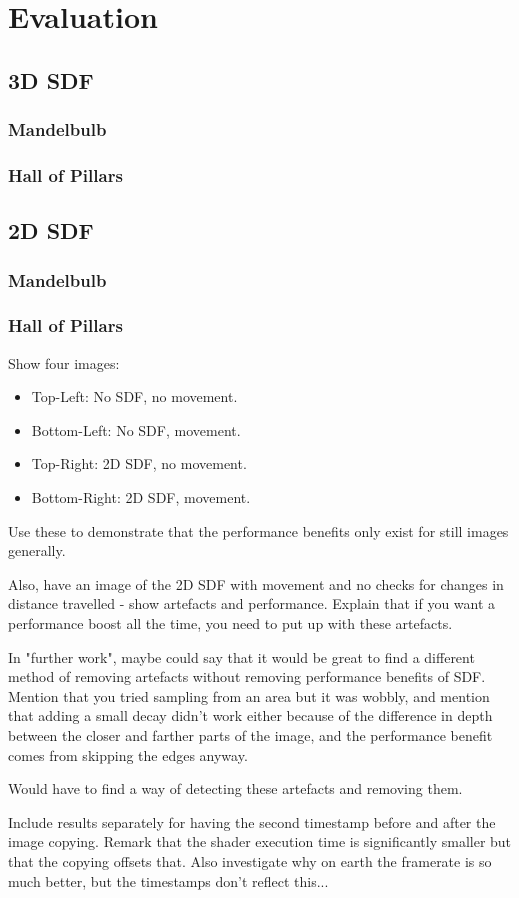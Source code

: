 \chapter{Evaluation}
\label{chapter5}

\section{3D SDF}

\subsection{Mandelbulb}

\subsection{Hall of Pillars}

\section{2D SDF}

\subsection{Mandelbulb}

\subsection{Hall of Pillars}

Show four images:
\begin{itemize}
	\item Top-Left: No SDF, no movement.
	\item Bottom-Left: No SDF, movement.
	\item Top-Right: 2D SDF, no movement.
	\item Bottom-Right: 2D SDF, movement.
\end{itemize}

Use these to demonstrate that the performance benefits only exist for still images generally.

Also, have an image of the 2D SDF with movement and no checks for changes in distance travelled - show artefacts and performance. Explain that if you want a performance boost all the time, you need to put up with these artefacts.

In "further work", maybe could say that it would be great to find a different method of removing artefacts without removing performance benefits of SDF. Mention that you tried sampling from an area but it was wobbly, and mention that adding a small decay didn't work either because of the difference in depth between the closer and farther parts of the image, and the performance benefit comes from skipping the edges anyway.

Would have to find a way of detecting these artefacts and removing them.

Include results separately for having the second timestamp before and after the image copying. Remark that the shader execution time is significantly smaller but that the copying offsets that. Also investigate why on earth the framerate is so much better, but the timestamps don't reflect this...